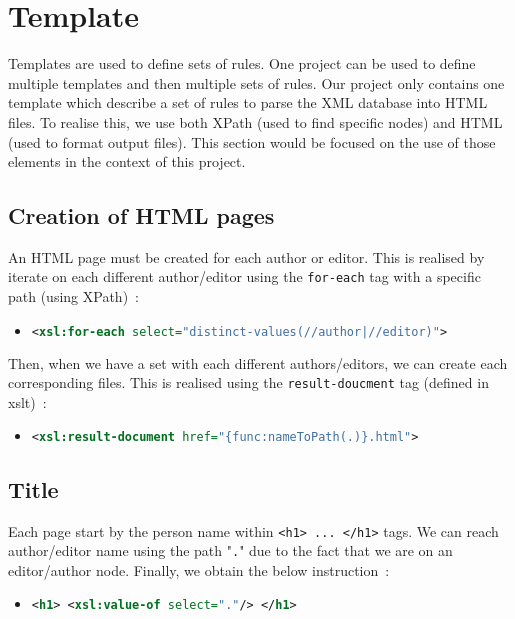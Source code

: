 \documentclass{article}
\begin{document}
\section{Template}
  Templates are used to define sets of rules. One project can be used to define multiple templates and then multiple sets of rules. Our project only contains one template which describe a set of rules to parse the XML database into HTML files. To realise this, we use both XPath (used to find specific nodes) and HTML (used to format output files). This section would be focused on the use of those elements in the context of this project.

  \subsection{Creation of HTML pages} 
  An HTML page must be created for each author or editor. This is realised by iterate on each different author/editor using the \verb|for-each| tag with a specific path (using XPath)~:
 \begin{itemize}
      \item \begin{lstlisting}[language=XML]
<xsl:for-each select="distinct-values(//author|//editor)">\end{lstlisting}
    \end{itemize}
    Then, when we have a set with each different authors/editors, we can create each corresponding files. This is realised using the \verb|result-doucment| tag (defined in xslt)~:
\begin{itemize}
      \item \begin{lstlisting}[language=XML]
<xsl:result-document href="{func:nameToPath(.)}.html">\end{lstlisting}
    \end{itemize}

  \subsection{Title}
    Each page start by the person name within \verb|<h1> ... </h1>| tags. We can reach author/editor name using the path "\verb|.|" due to the fact that we are on an editor/author node. Finally, we obtain the below instruction~:
    \begin{itemize}
      \item \begin{lstlisting}[language=XML]
<h1> <xsl:value-of select="."/> </h1>\end{lstlisting}
    \end{itemize}
\end{document}
